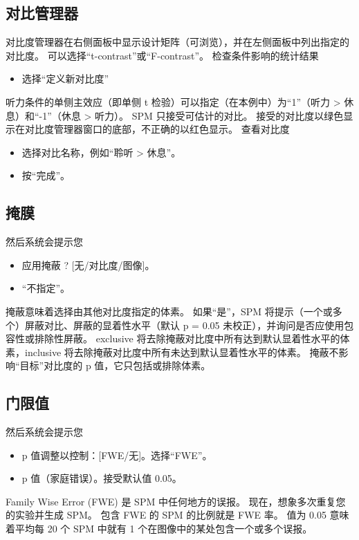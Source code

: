 \subsection{对比管理器}
对比度管理器在右侧面板中显示设计矩阵（可浏览），并在左侧面板中列出指定的对比度。 可以选择“t-contrast”或“F-contrast”。 检查条件影响的统计结果
\begin{itemize}
	\item 选择“定义新对比度”
\end{itemize}

听力条件的单侧主效应（即单侧 t 检验）可以指定（在本例中）为“1”（听力 > 休息）和“-1”（休息 > 听力）。 SPM 只接受可估计的对比。 接受的对比度以绿色显示在对比度管理器窗口的底部，不正确的以红色显示。 查看对比度

\begin{itemize}
	\item 选择对比名称，例如“聆听 > 休息”。
	\item 按“完成”。
\end{itemize}


\subsection{掩膜}
然后系统会提示您
\begin{itemize}
	\item 应用掩蔽 ? [无/对比度/图像]。
	\item “不指定”。
\end{itemize}

掩蔽意味着选择由其他对比度指定的体素。 如果“是”，SPM 将提示（一个或多个）屏蔽对比、屏蔽的显着性水平（默认 p = 0.05 未校正），并询问是否应使用包容性或排除性屏蔽。 exclusive 将去除掩蔽对比度中所有达到默认显着性水平的体素，inclusive 将去除掩蔽对比度中所有未达到默认显着性水平的体素。 掩蔽不影响“目标”对比度的 p 值，它只包括或排除体素。


\subsection{门限值}
然后系统会提示您
\begin{itemize}
	\item p 值调整以控制：[FWE/无]。选择“FWE”。
	\item p 值（家庭错误）。接受默认值 0.05。
\end{itemize}

Family Wise Error (FWE) 是 SPM 中任何地方的误报。 现在，想象多次重复您的实验并生成 SPM。 包含 FWE 的 SPM 的比例就是 FWE 率。 值为 0.05 意味着平均每 20 个 SPM 中就有 1 个在图像中的某处包含一个或多个误报。

